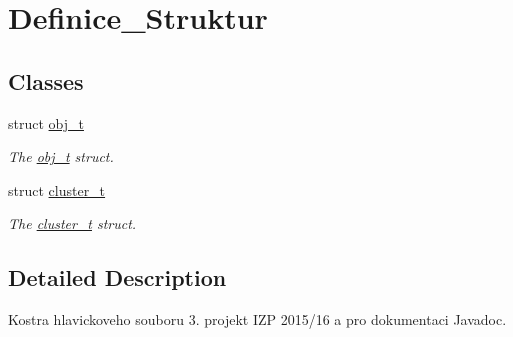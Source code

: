 \hypertarget{group__Definice__Struktur}{}\section{Definice\+\_\+\+Struktur}
\label{group__Definice__Struktur}
\subsection*{Classes}
\begin{DoxyCompactItemize}
\item 
struct \hyperlink{structobj__t}{obj\+\_\+t}
\begin{DoxyCompactList}\small\item\em The \hyperlink{structobj__t}{obj\+\_\+t} struct. \end{DoxyCompactList}\item 
struct \hyperlink{structcluster__t}{cluster\+\_\+t}
\begin{DoxyCompactList}\small\item\em The \hyperlink{structcluster__t}{cluster\+\_\+t} struct. \end{DoxyCompactList}\end{DoxyCompactItemize}


\subsection{Detailed Description}
Kostra hlavickoveho souboru 3. projekt I\+ZP 2015/16 a pro dokumentaci Javadoc. 